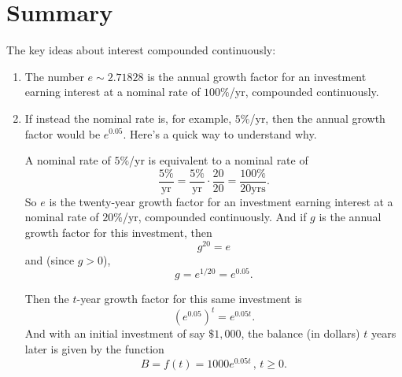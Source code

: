 \documentclass{ximera}
\begin{document}
\section{Summary}
The key ideas about interest compounded continuously:

\begin{enumerate}
\item The number $e\sim 2.71828$ is the annual growth factor for an investment earning interest at a nominal rate of $100\%$/yr, compounded continuously.

\item If instead the nominal rate is, for example, $5\%$/yr, then the annual growth factor would be $e^{0.05}$. Here's a quick way to understand why.

A nominal rate of $5\%$/yr is equivalent to a nominal rate of
\[
    \frac{5\%}{\text{yr}} = \frac{5\%}{\text{yr}} \cdot \frac{20}{20} = \frac{100\%}{20 \text{yrs}} .
\]
So $e$ is the twenty-year growth factor for an investment earning interest at a nominal rate of $20\%$/yr, compounded continuously. And if $g$ is the annual growth factor for this investment, then
\[
  g^{20} = e
\]
 and (since $g>0$),
\[
    g = e^{1/20}  = e^{0.05} .
\]

Then the $t$-year growth factor for this same investment is
\[
    \left( e^{0.05} \right)^t = e^{0.05t}.
\]
And with an initial investment of say $\$1,000$, the balance (in dollars) $t$ years later is given by the function
\[
  B = f(t) = 1000 e^{0.05t} \, , \, t\geq 0.
\]

\end{enumerate}
\end{document}
